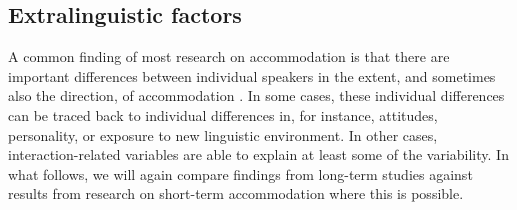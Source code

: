 \documentclass[output=paper,
modfonts
]{langscibook}
\begin{document}
\subsection{Extralinguistic factors} 
A common finding of most research on accommodation is that there are important differences between individual speakers in the extent, and sometimes also the direction, of accommodation \citep[e.g. ][]{yu_origins_2013,macleod_effect_2012,babel_evidence_2012,werlen_zwischen_2006,evans_plasticity_2007}. In some cases, these individual differences can be traced back to individual differences in, for instance, attitudes, personality, or exposure to new linguistic environment. In other cases, interaction-related variables are able to explain at least some of the variability. In what follows, we will again compare findings from long-term studies against results from research on short-term accommodation where this is possible.
% 
% 
\end{document}
